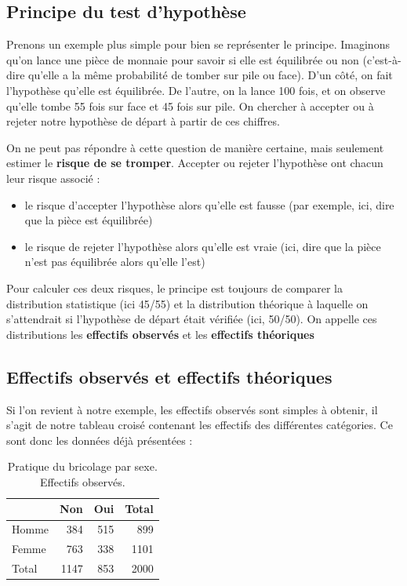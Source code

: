 \documentclass[
  french,
]{book}
\providecommand{\tightlist}{%
  \setlength{\itemsep}{0pt}\setlength{\parskip}{0pt}}
\begin{document}
\hypertarget{principe-du-test-dhypothuxe8se}{%
\subsection{Principe du test d'hypothèse}\label{principe-du-test-dhypothuxe8se}}

Prenons un exemple plus simple pour bien se représenter le principe. Imaginons qu'on lance une pièce de monnaie pour savoir si elle est équilibrée ou non (c'est-à-dire qu'elle a la même probabilité de tomber sur pile ou face). D'un côté, on fait l'hypothèse qu'elle est équilibrée. De l'autre, on la lance 100 fois, et on observe qu'elle tombe 55 fois sur face et 45 fois sur pile. On chercher à accepter ou à rejeter notre hypothèse de départ à partir de ces chiffres.

On ne peut pas répondre à cette question de manière certaine, mais seulement estimer le \textbf{risque de se tromper}. Accepter ou rejeter l'hypothèse ont chacun leur risque associé :

\begin{itemize}
\tightlist
\item
  le risque d'accepter l'hypothèse alors qu'elle est fausse (par exemple, ici, dire que la pièce est équilibrée)
\item
  le risque de rejeter l'hypothèse alors qu'elle est vraie (ici, dire que la pièce n'est pas équilibrée alors qu'elle l'est)
\end{itemize}

Pour calculer ces deux risques, le principe est toujours de comparer la distribution statistique (ici 45/55) et la distribution théorique à laquelle on s'attendrait si l'hypothèse de départ était vérifiée (ici, 50/50). On appelle ces distributions les \textbf{effectifs observés} et les \textbf{effectifs théoriques}

\hypertarget{effectifs-observuxe9s-et-effectifs-thuxe9oriques}{%
\subsection{Effectifs observés et effectifs théoriques}\label{effectifs-observuxe9s-et-effectifs-thuxe9oriques}}

Si l'on revient à notre exemple, les effectifs observés sont simples à obtenir, il s'agit de notre tableau croisé contenant les effectifs des différentes catégories. Ce sont donc les données déjà présentées :

\begin{table}

\caption{\label{tab:unnamed-chunk-23}Pratique du bricolage par sexe. Effectifs observés.}
\centering
\begin{tabular}[t]{l|r|r|r}
\hline
  & Non & Oui & Total\\
\hline
Homme & 384 & 515 & 899\\
\hline
Femme & 763 & 338 & 1101\\
\hline
Total & 1147 & 853 & 2000\\
\hline
\end{tabular}
\end{table}
\end{document}
